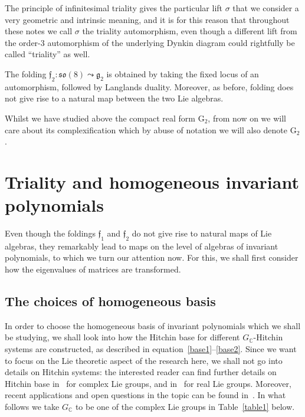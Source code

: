 \documentclass[10pt,a4paper]{amsart}
\numberwithin{equation}{section}
\begin{document}
\begin{Remark}
The principle of infinitesimal triality gives the particular lift $\sigma$ that we consider a very geometric and intrinsic meaning, and it is for this reason that throughout these notes we call $\sigma$ the triality automorphism, even though a different lift from the order-3 automorphism of the underlying Dynkin diagram could rightfully be called ``triality'' as well.
\end{Remark}

\begin{Remark}The folding $\mathfrak{f}_2\colon \mathfrak{so}(8) \leadsto \mathfrak{g}_2$ is obtained by taking the fixed locus of an automorphism, followed by Langlands duality. Moreover, as before, folding does not give rise to a natural map between the two Lie algebras.\end{Remark}

Whilst we have studied above the compact real form $\mathrm{G}_2$, from now on we will care about its complexification which by abuse of notation we will also denote $\mathrm{G}_2$.

\section{Triality and homogeneous invariant polynomials}\label{tri:higgs} Even though the foldings $\mathfrak{f}_1$ and $\mathfrak{f}_2$ do not give rise to natural maps of Lie algebras, they remarkably lead to maps on the level of algebras of invariant polynomials, to which we turn our attention now. For this, we shall first consider how the eigenvalues of matrices are transformed.


\subsection{The choices of homogeneous basis} In order to choose the homogeneous basis of invariant polynomials which we shall be studying, we shall look into how the Hitchin base for different $G_\mathbb{C}$-Hitchin systems are constructed, as described in equation~\eqref{base1}--\eqref{base2}. Since we want to focus on the Lie theoretic aspect of the research here, we shall not go into details on Hitchin systems: the interested reader can find further details on Hitchin base in~\cite{N2} for complex Lie groups, and in~\cite{thesis} for real Lie groups. Moreover, recent applications and open questions in the topic can be found in~\cite{notices}.
 In what follows we take $G_\mathbb{C}$ to be one of the complex Lie groups in Table~\ref{table1} below.
\end{document}

